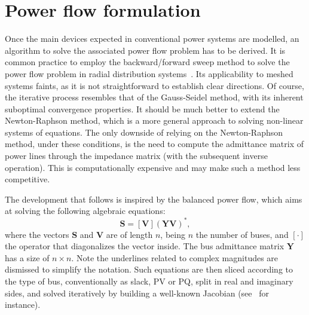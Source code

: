 \documentclass[11pt]{article}
\begin{document}
	\section{Power flow formulation}
	Once the main devices expected in conventional power systems are modelled, an algorithm to solve the associated power flow problem has to be derived. It is common practice to employ the backward/forward sweep method to solve the power flow problem in radial distribution systems~\cite{rupa2014power}. Its applicability to meshed systems faints, as it is not straightforward to establish clear directions. Of course, the iterative process resembles that of the Gauss-Seidel method, with its inherent suboptimal convergence properties. It should be much better to extend the Newton-Raphson method, which is a more general approach to solving non-linear systems of equations. The only downside of relying on the Newton-Raphson method, under these conditions, is the need to compute the admittance matrix of power lines through the impedance matrix (with the subsequent inverse operation). This is computationally expensive and may make such a method less competitive. 

	The development that follows is inspired by the balanced power flow, which aims at solving the following algebraic equations:
	\begin{equation}
		\bm{S} = [\bm{V}](\bm{Y}\bm{V})^*,
	\end{equation}
	where the vectors $\bm{S}$ and $\bm{V}$ are of length $n$, being $n$ the number of buses, and $[\cdot]$ the operator that diagonalizes the vector inside. The bus admittance matrix $\bm{Y}$ has a size of $n \times n$. Note the underlines related to complex magnitudes are dismissed to simplify the notation. Such equations are then sliced according to the type of bus, conventionally as slack, PV or PQ, split in real and imaginary sides, and solved iteratively by building a well-known Jacobian (see~\cite{zimmerman2010ac} for instance). 
\end{document}
